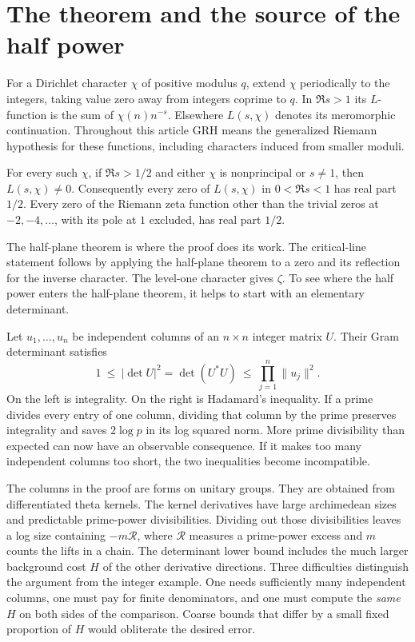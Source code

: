\section{The theorem and the source of the half power}\label{sec:opening}
For a Dirichlet character \(\chi\) of positive modulus \(q\), extend \(\chi\) periodically to the integers, taking value zero away from integers coprime to \(q\). In \(\Re s>1\) its \(L\)-function is the sum of \(\chi(n)n^{-s}\). Elsewhere \(L(s,\chi)\) denotes its meromorphic continuation. Throughout this article GRH means the generalized Riemann hypothesis for these functions, including characters induced from smaller moduli.

\begin{statement}\label{thm:main}
For every such \(\chi\), if \(\Re s>1/2\) and either \(\chi\) is nonprincipal or \(s\ne1\), then \(L(s,\chi)\ne0\). Consequently every zero of \(L(s,\chi)\) in \(0<\Re s<1\) has real part \(1/2\). Every zero of the Riemann zeta function other than the trivial zeros at \(-2,-4,\dots\), with its pole at \(1\) excluded, has real part \(1/2\).
\end{statement}

The half-plane theorem is where the proof does its work. The critical-line statement follows by applying the half-plane theorem to a zero and its reflection for the inverse character. The level-one character gives \(\zeta\). To see where the half power enters the half-plane theorem, it helps to start with an elementary determinant.

Let \(u_1,\ldots,u_n\) be independent columns of an \(n\times n\) integer matrix \(U\). Their Gram determinant satisfies
\[
  1\ \le\ |\det U|^2=\det(U^*U)\ \le\ \prod_{j=1}^n\|u_j\|^2 .
\]
On the left is integrality. On the right is Hadamard's inequality. If a prime divides every entry of one column, dividing that column by the prime preserves integrality and saves \(2\log p\) in its log squared norm. More prime divisibility than expected can now have an observable consequence. If it makes too many independent columns too short, the two inequalities become incompatible.

The columns in the proof are forms on unitary groups. They are obtained from differentiated theta kernels. The kernel derivatives have large archimedean sizes and predictable prime-power divisibilities. Dividing out those divisibilities leaves a log size containing \(-m\mathcal R\), where \(\mathcal R\) measures a prime-power excess and \(m\) counts the lifts in a chain. The determinant lower bound includes the much larger background cost \(H\) of the other derivative directions. Three difficulties distinguish the argument from the integer example. One needs sufficiently many independent columns, one must pay for finite denominators, and one must compute the \emph{same} \(H\) on both sides of the comparison. Coarse bounds that differ by a small fixed proportion of \(H\) would obliterate the desired error.


